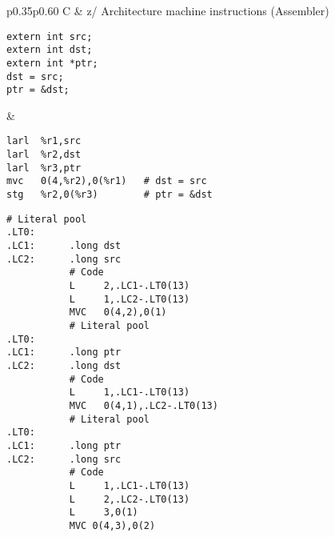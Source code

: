 \documentclass[english,11pt,twoside,toc=bib,toc=idx]{scrreprt}
\newcommand{\ARCH}{z/\kern-1pt Ar\-chi\-tec\-ture}
\newcommand{\ARCH}{ESA/390}
\newenvironment{DIFnomarkup}{}{} %
\begin{document}
\begin{table}
  \centering
  \begin{DIFnomarkup}
  \begin{tabular}{p{}p{}}
    \toprule
    C & \ARCH{} machine instructions (Assembler) \\
    \midrule
\begin{lstlisting}[style=short]
extern int src;
extern int dst;
extern int *ptr;
dst = src;
ptr = &dst;
\end{lstlisting}
    &
\ifzseries
\begin{lstlisting}[style=short,language=simpleasm]
larl  %r1,src
larl  %r2,dst
larl  %r3,ptr
mvc   0(4,%r2),0(%r1)   # dst = src
stg   %r2,0(%r3)        # ptr = &dst
\end{lstlisting}
\else
\begin{lstlisting}[style=short,language=simpleasm]
           # Literal pool
.LT0:
.LC1:      .long dst
.LC2:      .long src
           # Code
           L     2,.LC1-.LT0(13)
           L     1,.LC2-.LT0(13)
           MVC   0(4,2),0(1)
           # Literal pool
.LT0:
.LC1:      .long ptr
.LC2:      .long dst
           # Code
           L     1,.LC1-.LT0(13)
           MVC   0(4,1),.LC2-.LT0(13)
           # Literal pool
.LT0:
.LC1:      .long ptr
.LC2:      .long src
           # Code
           L     1,.LC1-.LT0(13)
           L     2,.LC2-.LT0(13)
           L     3,0(1)
           MVC 0(4,3),0(2)
\end{lstlisting}
\fi \\
    \bottomrule
  \end{tabular}
  \end{DIFnomarkup}
  \caption{Absolute addressing}
  \label{tab:addresses}
\end{table}
\end{document}
